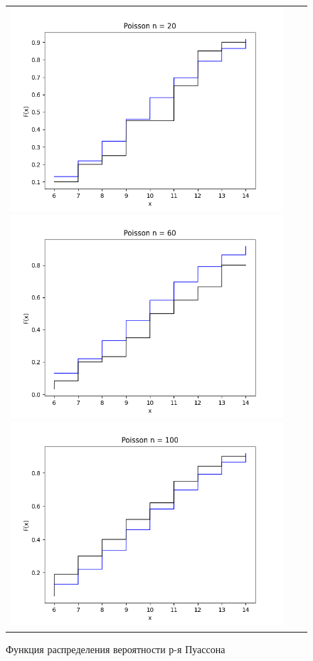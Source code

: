 \begin{figure}[H]
	\begin{tabular}{ccc}
		\includegraphics[scale=0.33]{poisson_F20.png}
		\includegraphics[scale=0.33]{poisson_F60.png}
		\includegraphics[scale=0.33]{poisson_F100.png}
	\end{tabular}
	\caption{Функция распределения вероятности р-я Пуассона}
\end{figure}


